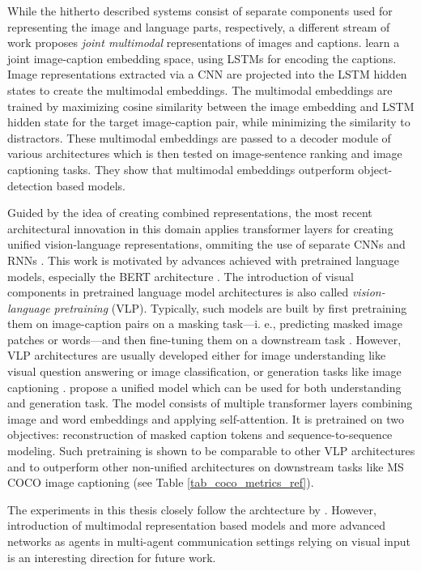 While the hitherto described systems consist of separate components used for representing the image and language parts, respectively, a different stream of work proposes \textit{joint multimodal} representations of images and captions. \cite{kiros2014unifying} learn a joint image-caption embedding space, using LSTMs for encoding the captions. Image representations extracted via a CNN are projected into the LSTM hidden states to create the multimodal embeddings. The multimodal embeddings are trained by maximizing cosine similarity between the image embedding and LSTM hidden state for the target image-caption pair, while minimizing the similarity to distractors. These multimodal embeddings are passed to a decoder module of various architectures which is then tested on image-sentence ranking and image captioning tasks. They show that multimodal embeddings outperform object-detection based models.

Guided by the idea of creating combined representations, the most recent architectural innovation in this domain applies transformer layers for creating unified vision-language representations, ommiting the use of separate CNNs and RNNs \parencite{vaswani2017attention, zhou2019unified}. This work is motivated by advances achieved with pretrained language models, especially the BERT architecture \parencite{devlin2018bert}. The introduction of visual components in pretrained language model architectures is also called \textit{vision-language pretraining} (VLP). Typically, such models are built by first pretraining them on image-caption pairs on a masking task---i. e., predicting masked image patches or words---and then fine-tuning them on a downstream task \parencite[e. g.,][]{lu2019vilbert}.
However, VLP architectures are usually developed either for image understanding like visual question answering or image classification, or generation tasks like image captioning \parencite{zhou2019unified}. 
\cite{zhou2019unified} propose a unified model which can be used for both understanding and generation task. 
The model consists of multiple transformer layers combining image and word embeddings and applying self-attention. It is pretrained on two objectives: reconstruction of masked caption tokens and sequence-to-sequence modeling. Such pretraining is shown to be comparable to other VLP architectures and to outperform other non-unified architectures on downstream tasks like MS COCO image captioning (see Table \ref{tab_coco_metrics_ref}). 

The experiments in this thesis closely follow the archtecture by \cite{vinyals2015show}. However, introduction of multimodal representation based models and more advanced networks as agents in multi-agent communication settings relying on visual input is an interesting direction for future work. 

